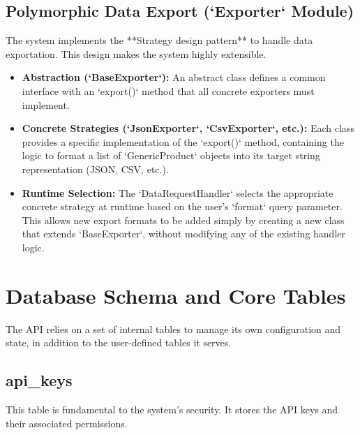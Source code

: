 \documentclass[12pt, a4paper]{report}
\begin{document}
\subsection{Polymorphic Data Export (`Exporter` Module)}
The system implements the **Strategy design pattern** to handle data exportation. This design makes the system highly extensible.
\begin{itemize}
    \item \textbf{Abstraction (`BaseExporter`):} An abstract class defines a common interface with an `export()` method that all concrete exporters must implement.
    \item \textbf{Concrete Strategies (`JsonExporter`, `CsvExporter`, etc.):} Each class provides a specific implementation of the `export()` method, containing the logic to format a list of `GenericProduct` objects into its target string representation (JSON, CSV, etc.).
    \item \textbf{Runtime Selection:} The `DataRequestHandler` selects the appropriate concrete strategy at runtime based on the user's `format` query parameter. This allows new export formats to be added simply by creating a new class that extends `BaseExporter`, without modifying any of the existing handler logic.
\end{itemize}

\section{Database Schema and Core Tables}
The API relies on a set of internal tables to manage its own configuration and state, in addition to the user-defined tables it serves.

\subsection*{api\_keys}
This table is fundamental to the system's security. It stores the API keys and their associated permissions.
\end{document}
